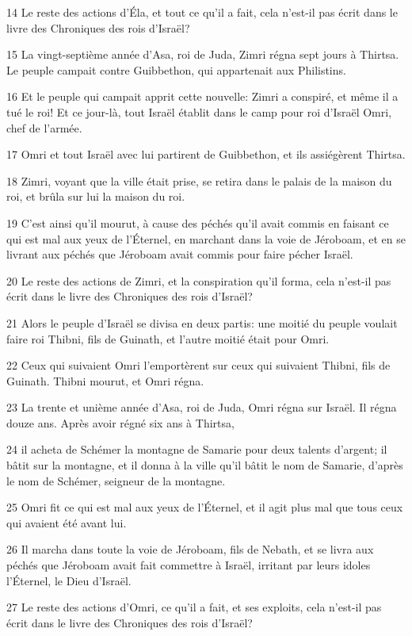 \par 14 Le reste des actions d'Éla, et tout ce qu'il a fait, cela n'est-il pas écrit dans le livre des Chroniques des rois d'Israël?
\par 15 La vingt-septième année d'Asa, roi de Juda, Zimri régna sept jours à Thirtsa. Le peuple campait contre Guibbethon, qui appartenait aux Philistins.
\par 16 Et le peuple qui campait apprit cette nouvelle: Zimri a conspiré, et même il a tué le roi! Et ce jour-là, tout Israël établit dans le camp pour roi d'Israël Omri, chef de l'armée.
\par 17 Omri et tout Israël avec lui partirent de Guibbethon, et ils assiégèrent Thirtsa.
\par 18 Zimri, voyant que la ville était prise, se retira dans le palais de la maison du roi, et brûla sur lui la maison du roi.
\par 19 C'est ainsi qu'il mourut, à cause des péchés qu'il avait commis en faisant ce qui est mal aux yeux de l'Éternel, en marchant dans la voie de Jéroboam, et en se livrant aux péchés que Jéroboam avait commis pour faire pécher Israël.
\par 20 Le reste des actions de Zimri, et la conspiration qu'il forma, cela n'est-il pas écrit dans le livre des Chroniques des rois d'Israël?
\par 21 Alors le peuple d'Israël se divisa en deux partis: une moitié du peuple voulait faire roi Thibni, fils de Guinath, et l'autre moitié était pour Omri.
\par 22 Ceux qui suivaient Omri l'emportèrent sur ceux qui suivaient Thibni, fils de Guinath. Thibni mourut, et Omri régna.
\par 23 La trente et unième année d'Asa, roi de Juda, Omri régna sur Israël. Il régna douze ans. Après avoir régné six ans à Thirtsa,
\par 24 il acheta de Schémer la montagne de Samarie pour deux talents d'argent; il bâtit sur la montagne, et il donna à la ville qu'il bâtit le nom de Samarie, d'après le nom de Schémer, seigneur de la montagne.
\par 25 Omri fit ce qui est mal aux yeux de l'Éternel, et il agit plus mal que tous ceux qui avaient été avant lui.
\par 26 Il marcha dans toute la voie de Jéroboam, fils de Nebath, et se livra aux péchés que Jéroboam avait fait commettre à Israël, irritant par leurs idoles l'Éternel, le Dieu d'Israël.
\par 27 Le reste des actions d'Omri, ce qu'il a fait, et ses exploits, cela n'est-il pas écrit dans le livre des Chroniques des rois d'Israël?
